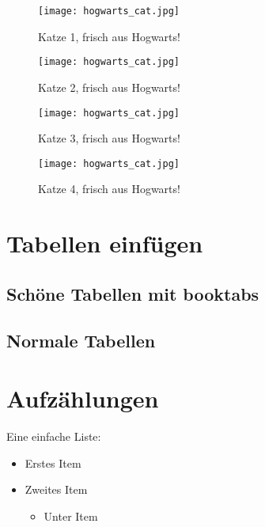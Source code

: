 \begin{figure}[H]
    \begin{minipage}{0.5\textwidth}
        \centering
        \texttt{[image: hogwarts\_cat.jpg]}
        \caption*{Katze 1, frisch aus Hogwarts!}
        \vspace{2ex}
    \end{minipage}
    \begin{minipage}{0.5\textwidth}
        \centering
        \texttt{[image: hogwarts\_cat.jpg]}
        \caption*{Katze 2, frisch aus Hogwarts!}
        \vspace{2ex}
    \end{minipage}
    \begin{minipage}{0.5\textwidth}
        \centering
        \texttt{[image: hogwarts\_cat.jpg]}
        \caption*{Katze 3, frisch aus Hogwarts!}
        \vspace{2ex}
    \end{minipage}
    \begin{minipage}{0.5\textwidth}
        \centering
        \texttt{[image: hogwarts\_cat.jpg]}
        \caption*{Katze 4, frisch aus Hogwarts!}
        \vspace{2ex}
    \end{minipage}
\end{figure}

\chapter{Tabellen einfügen}
\section{Schöne Tabellen mit booktabs}
\section{Normale Tabellen}

\chapter{Aufzählungen}
Eine einfache Liste:
\begin{itemize}
    \item Erstes Item
    \item Zweites Item
          \begin{itemize}
              \item Unter Item
          \end{itemize}
\end{itemize}

